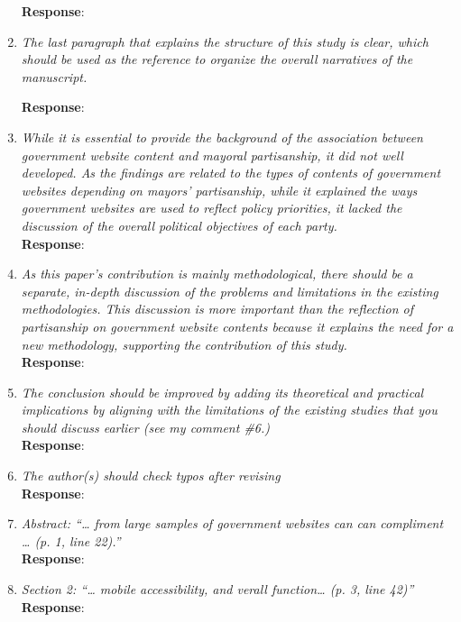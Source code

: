 \documentclass[12pt,titlepage]{article}
\begin{document}
\begin{enumerate}
     \textbf{Response}: 


\item \emph{The last paragraph that explains the structure of this study is clear, which should be used as the reference to organize the overall narratives of the manuscript.}

     \textbf{Response}: 


\item \emph{ While it is essential to provide the background of the association between government website content and mayoral partisanship, it did not well developed. As the findings are related to the types of contents of government websites depending on mayors’ partisanship, while it explained the ways government websites are used to reflect policy priorities, it lacked the discussion of the overall political objectives of each party. }\\

    \textbf{Response}: 
    
    \item \emph{As this paper’s contribution is mainly methodological, there should be a separate, in-depth discussion of the problems and limitations in the existing methodologies. This discussion is more important than the reflection of partisanship on government website contents because it explains the need for a new methodology, supporting the contribution of this study.}\\

    \textbf{Response}: 
    
        \item \emph{The conclusion should be improved by adding its theoretical and practical implications by aligning with the limitations of the existing studies that you should discuss earlier (see my comment \#6.)}\\

    \textbf{Response}: 
    
    
            \item \emph{The author(s) should check typos after revising}\\

    \textbf{Response}: 
    
     \item \emph{Abstract: “… from large samples of government websites can can compliment … (p. 1, line 22).”}\\

    \textbf{Response}: 
    
    \item \emph{Section 2: “… mobile accessibility, and verall function… (p. 3, line 42)”}\\

    \textbf{Response}: 


    

\end{enumerate}





\newpage
\singlespacing
%
% 
\end{document}
